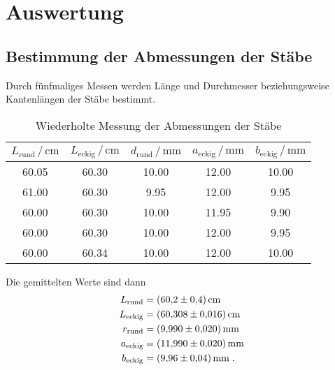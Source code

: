 \section{Auswertung} \label{sec:auswertung}

\subsection{Bestimmung der Abmessungen der Stäbe} \label{sec:abmessungen}

Durch fünfmaliges Messen werden Länge und Durchmesser beziehungsweise Kantenlängen der Stäbe bestimmt.


\begin{table}
\centering
\caption{Wiederholte Messung der Abmessungen der Stäbe}
\begin{tabular}{c c c c c}
\toprule
$L_\text{rund}  \,/\, \si{\centi\meter}$ &
$L_\text{eckig} \,/\, \si{\centi\meter}$ &
$d_\text{rund}  \,/\, \si{\milli\meter}$ &
$a_\text{eckig} \,/\, \si{\milli\meter}$ &
$b_\text{eckig} \,/\, \si{\milli\meter}$ \\
\midrule
\num{60.05} &	\num{60.30} &	\num{10.00} &	\num{12.00} &	\num{10.00} \\
\num{61.00} &	\num{60.30} &	\num{9.95}  &	\num{12.00} &	\num{9.95}  \\
\num{60.00} &	\num{60.30} &	\num{10.00} &	\num{11.95} &	\num{9.90}  \\
\num{60.00} &	\num{60.30} &	\num{10.00} &	\num{12.00} &	\num{9.95}  \\
\num{60.00} &	\num{60.34} &	\num{10.00} &	\num{12.00} &	\num{10.00} \\
\bottomrule
\end{tabular}
\end{table}

Die gemittelten Werte sind dann
\begin{align*}
L_\text{rund}  &= \SI{60.2 \pm 0.4}{\centi\meter}     \\
L_\text{eckig} &= \SI{60.308 \pm 0.016}{\centi\meter} \\
r_\text{rund}  &= \SI{9.990 \pm 0.020}{\milli\meter}  \\
a_\text{eckig} &= \SI{11.990 \pm 0.020}{\milli\meter} \\
b_\text{eckig} &= \SI{9.96 \pm 0.04}{\milli\meter}    \; .
\end{align*}






